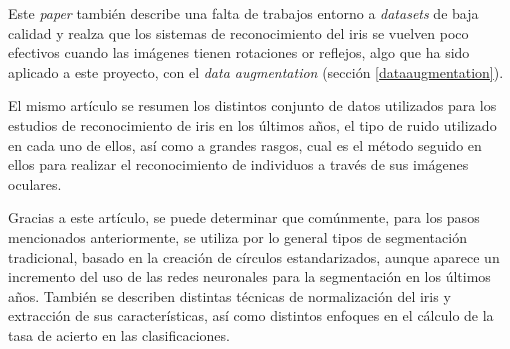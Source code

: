  Este \textit{paper} también describe una falta de trabajos entorno a \textit{datasets} de baja calidad y realza que los sistemas de reconocimiento del iris se vuelven 
 poco efectivos cuando las imágenes tienen rotaciones or reflejos, algo que ha sido aplicado a este proyecto, con el \textit{data augmentation} (sección \ref{dataaugmentation}).

 El mismo artículo se resumen los distintos conjunto de datos utilizados para los estudios de reconocimiento de iris en los últimos años, el tipo de ruido utilizado en cada uno de ellos,
 así como a grandes rasgos, cual es el método seguido en ellos para realizar el reconocimiento de individuos a través de sus imágenes oculares.
 
 Gracias a este artículo, se puede determinar que comúnmente, para los pasos mencionados anteriormente, se utiliza por lo general tipos de segmentación tradicional, basado en la creación de círculos estandarizados, aunque aparece un incremento del uso de las redes neuronales para la segmentación en los últimos años.
 También se describen distintas técnicas de normalización del iris y extracción de sus características, así como distintos enfoques en el cálculo de la tasa de acierto en las clasificaciones.





